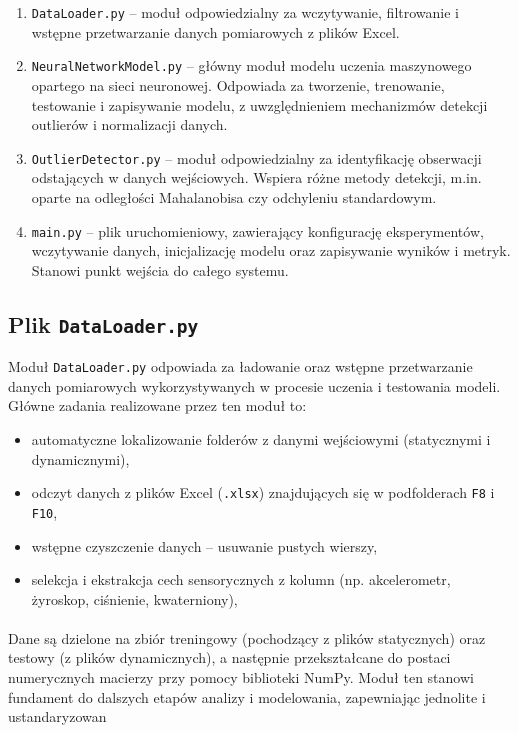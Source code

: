 \documentclass{classrep}
\begin{document}
\begin{enumerate}
	\item \texttt{DataLoader.py} – moduł odpowiedzialny za wczytywanie, filtrowanie i wstępne przetwarzanie danych pomiarowych z plików Excel.

	\item \texttt{NeuralNetworkModel.py} – główny moduł modelu uczenia maszynowego opartego na sieci neuronowej. Odpowiada za tworzenie, trenowanie, testowanie i zapisywanie modelu, z uwzględnieniem mechanizmów detekcji outlierów i normalizacji danych.

	\item \texttt{OutlierDetector.py} – moduł odpowiedzialny za identyfikację obserwacji odstających w danych wejściowych. Wspiera różne metody detekcji, m.in. oparte na odległości Mahalanobisa czy odchyleniu standardowym.

	\item \texttt{main.py} – plik uruchomieniowy, zawierający konfigurację eksperymentów, wczytywanie danych, inicjalizację modelu oraz zapisywanie wyników i metryk. Stanowi punkt wejścia do całego systemu.

\end{enumerate}

\clearpage{}
\subsection{Plik \texttt{DataLoader.py}}

Moduł \texttt{DataLoader.py} odpowiada za ładowanie oraz wstępne przetwarzanie danych pomiarowych wykorzystywanych w procesie uczenia i testowania modeli.
Główne zadania realizowane przez ten moduł to:
\begin{itemize}
	\item automatyczne lokalizowanie folderów z danymi wejściowymi (statycznymi i dynamicznymi),
	\item odczyt danych z plików Excel (\texttt{.xlsx}) znajdujących się w podfolderach \texttt{F8} i \texttt{F10},
	\item wstępne czyszczenie danych – usuwanie pustych wierszy,
	\item selekcja i ekstrakcja cech sensorycznych z kolumn (np. akcelerometr, żyroskop, ciśnienie, kwaterniony),
\end{itemize}
\paragraph{}
Dane są dzielone na zbiór treningowy (pochodzący z plików statycznych) oraz testowy (z plików dynamicznych), a następnie przekształcane do postaci numerycznych macierzy przy pomocy biblioteki NumPy.
Moduł ten stanowi fundament do dalszych etapów analizy i modelowania, zapewniając jednolite i ustandaryzowan
\end{document}
